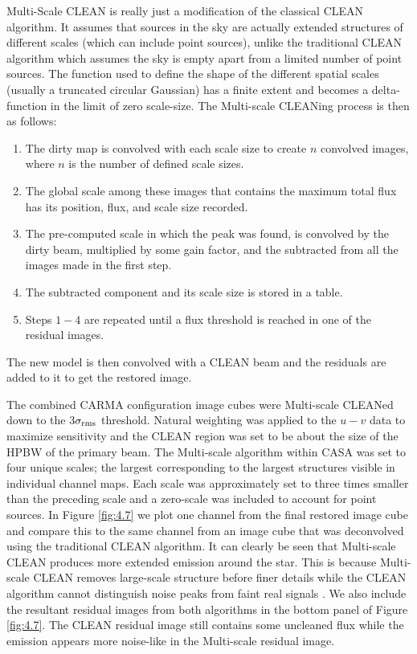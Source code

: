 Multi-Scale CLEAN is really just a modification of the classical CLEAN algorithm. It assumes that sources in the sky are actually extended structures of different scales (which can include point sources), unlike the traditional CLEAN algorithm which assumes the sky is empty apart from a limited number of point sources. The function used to define the shape of the different spatial scales (usually a truncated circular Gaussian) has a finite extent and becomes a delta-function in the limit of zero scale-size. The Multi-scale CLEANing process is then as follows:
\begin{enumerate}
\item The dirty map is convolved with each scale size to create $n$ convolved images, where $n$ is the number of defined scale sizes.
\item The global scale among these images that contains the maximum total flux has its position, flux, and scale size recorded.
\item The pre-computed scale in which the peak was found, is convolved by the dirty beam, multiplied by some gain factor, and the subtracted from all the images made in the first step.
\item The subtracted component and its scale size is stored in a table.
\item Steps $1-4$ are repeated until a flux threshold is reached in one of the residual images.
\end{enumerate}
The new model is then convolved with a CLEAN beam and the residuals are added to it to get the restored image.

The combined CARMA configuration image cubes were Multi-scale CLEANed down to the 3$\sigma _{\rm{rms}}$ threshold. Natural weighting was applied to the $u-v$ data to maximize sensitivity and the CLEAN region was set to be about the size of the HPBW of the primary beam. The Multi-scale algorithm  within CASA was set to four unique scales; the largest corresponding to the largest structures visible in individual channel maps. Each scale was approximately set to three times smaller than the preceding scale and a zero-scale was included to account for point sources. In Figure \ref{fig:4.7} we plot one channel from the final restored image cube and compare this to the same channel from an image cube that was deconvolved using the traditional CLEAN algorithm. It can clearly be seen that Multi-scale CLEAN produces more extended emission around the star. This is because Multi-scale CLEAN removes large-scale structure before finer details while the CLEAN algorithm cannot distinguish noise peaks from faint real signals \citep{rich_2008}. We also include the resultant residual images from both algorithms in the bottom panel of Figure \ref{fig:4.7}. The CLEAN residual image still contains some uncleaned flux while the emission appears more noise-like in the Multi-scale residual image.
